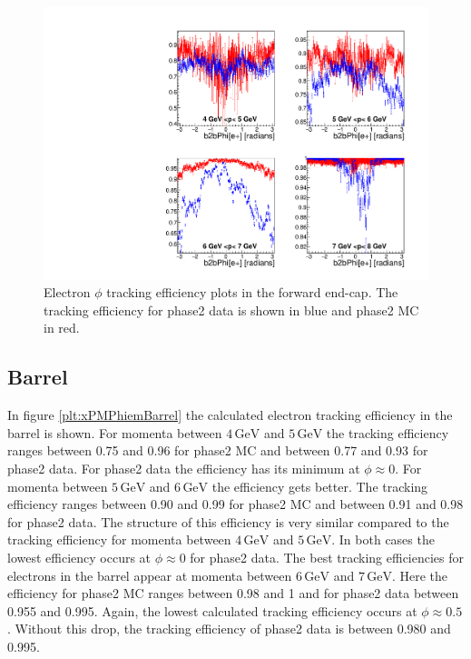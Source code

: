 \documentclass[a4paper,11pt,twosided,final,german,openbib,pdftex,listof=totoc,bibliography=totoc]{scrbook}
\begin{document}
\begin{figure}[!htbp]
	\centering
	\includegraphics[width=\textwidth]{Plots/master/xPMPhiemFC}
	\caption[Momentum $\phi$ Electron Forward End-Cap Efficiency Phase2]{Electron $\phi$ tracking efficiency plots in the forward end-cap. The tracking efficiency for phase2 data is shown in blue and phase2 MC in red.}
		\label{plt:xPMPhiemFC}
\end{figure}

\newpage

\subsection{Barrel}

In figure \ref{plt:xPMPhiemBarrel} the calculated electron tracking efficiency in the barrel is shown. For momenta between $4\,\textrm{GeV}$ and $5\,\textrm{GeV}$ the tracking efficiency ranges between 0.75 and 0.96 for phase2 MC and between 0.77 and 0.93 for phase2 data. For phase2 data the efficiency has its minimum at $\phi \approx 0$. For momenta between $5\,\textrm{GeV}$ and $6\,\textrm{GeV}$ the efficiency gets better. The tracking efficiency ranges between 0.90 and 0.99 for phase2 MC and between 0.91 and 0.98 for phase2 data. The structure of this efficiency is very similar compared to the tracking efficiency for momenta between $4\,\textrm{GeV}$ and $5\,\textrm{GeV}$. In both cases the lowest efficiency occurs at $\phi \approx 0$ for phase2 data. The best tracking efficiencies for electrons in the barrel appear at momenta between $6\,\textrm{GeV}$ and $7\,\textrm{GeV}$. Here the efficiency for phase2 MC ranges between 0.98 and 1 and for phase2 data between 0.955 and 0.995. Again, the lowest calculated tracking efficiency occurs at  $\phi \approx 0.5$. Without this drop, the tracking efficiency of phase2 data is between 0.980 and 0.995. 
\end{document}
